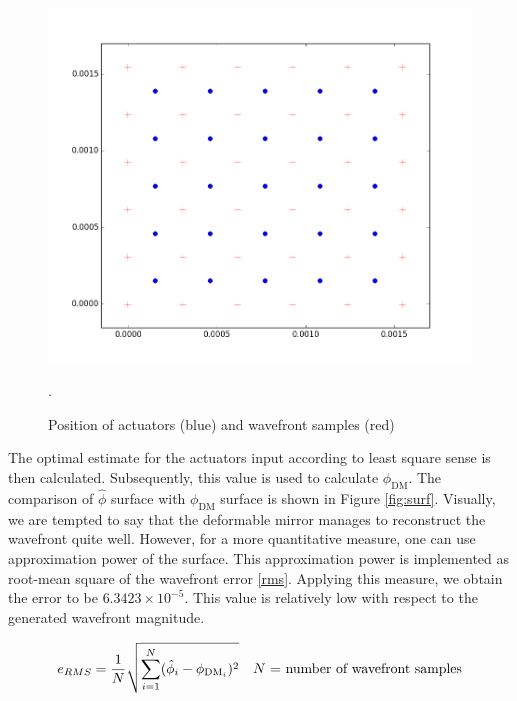 \documentclass[]{article}
\begin{document}
\begin{figure}[h!]
\centering
\includegraphics[width=0.7\linewidth]{figures/mirror_config}
\caption{Position of actuators (blue) and wavefront samples (red)}.
\label{mirror_config}
\end{figure}

The optimal estimate for the actuators input according to least square sense is then calculated. Subsequently, this value is used to calculate $ \phi_{\text{DM}} $. The comparison of $ \hat{\phi} $ surface  with  $ \phi_{\text{DM}} $ surface is shown in Figure \ref{fig:surf}. Visually, we are tempted to say that the deformable mirror manages to reconstruct the wavefront quite well. However, for a more quantitative measure, one can use approximation power of the surface. This approximation power is implemented as root-mean square of the wavefront error \eqref{rms}. Applying this measure, we obtain the error to be $ 6.3423\times10^{-5} $. This value is relatively low with respect to the generated wavefront magnitude. 

\begin{equation}
e_{RMS} = \frac{1}{N}\sqrt{\sum_{i=1}^{N} (\hat{\phi}_i  - \phi_{\text{DM}_i})^2} \quad \text{$ N $ = number of wavefront samples}
\label{rms}
\end{equation}
\end{document}
